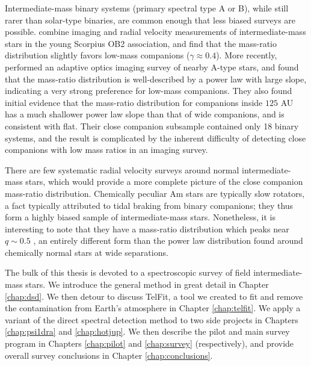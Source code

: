 \documentclass{utthesis}
\begin{document}
Intermediate-mass binary systems (primary spectral type A or B), while still rarer than solar-type binaries, are common enough that less biased surveys are possible. \citet{Kouwenhoven2007} combine imaging and radial velocity measurements of intermediate-mass stars in the young Scorpius OB2 association, and find that the mass-ratio distribution slightly favors low-mass companions ($\gamma \approx 0.4$). More recently, \citet{DeRosa2014} performed an adaptive optics imaging survey of nearby A-type stars, and found that the mass-ratio distribution is well-described by a power law with large slope, indicating a very strong preference for low-mass companions. They also found initial evidence that the mass-ratio distribution for companions inside $125$ AU has a much shallower power law slope than that of wide companions, and is consistent with flat. Their close companion subsample contained only 18 binary systems, and the result is complicated by the inherent difficulty of detecting close companions with low mass ratios in an imaging survey. 

There are few systematic radial velocity surveys around normal intermediate-mass stars, which would provide a more complete picture of the close companion mass-ratio distribution. Chemically peculiar Am stars are typically slow rotators, a fact typically attributed to tidal braking from binary companions; they thus form a highly biased sample of intermediate-mass stars. Nonetheless, it is interesting to note that they have a mass-ratio distribution which peaks near $q \sim 0.5$ \citep{Vuissoz2004}, an entirely different form than the power law distribution found around chemically normal stars at wide separations.

The bulk of this thesis is devoted to a spectroscopic survey of field intermediate-mass stars. We introduce the general method in great detail in Chapter \ref{chap:dsd}. We then detour to discuss TelFit, a tool we created to fit and remove the contamination from Earth's atmosphere in Chapter \ref{chap:telfit}. We apply a variant of the direct spectral detection method to two side projects in Chapters \ref{chap:psi1dra} and \ref{chap:hotjup}. We then describe the pilot and main survey program in Chapters \ref{chap:pilot} and \ref{chap:survey} (respectively), and provide overall survey conclusions in Chapter \ref{chap:conclusions}.


\end{document}
